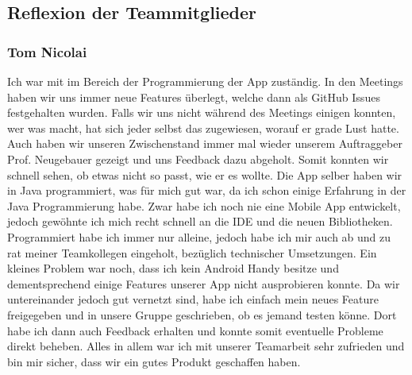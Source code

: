\documentclass{article}
\begin{document}
\subsection{Reflexion der Teammitglieder}
\subsubsection{Tom Nicolai}
    Ich war mit im Bereich der Programmierung der App zuständig. In den Meetings haben wir uns immer neue Features überlegt, 
    welche dann als GitHub Issues festgehalten wurden. Falls wir uns nicht während des Meetings einigen konnten, wer was macht, 
    hat sich jeder selbst das zugewiesen, worauf er grade Lust hatte. Auch haben wir unseren Zwischenstand immer mal wieder unserem 
Auftraggeber Prof. Neugebauer gezeigt und uns Feedback dazu abgeholt. Somit konnten wir schnell sehen, ob etwas nicht so passt, 
    wie er es wollte. Die App selber haben wir in Java programmiert, was für mich gut war, da ich schon einige Erfahrung 
    in der Java Programmierung habe. Zwar habe ich noch nie eine Mobile App entwickelt, jedoch gewöhnte ich mich recht schnell 
    an die IDE und die neuen Bibliotheken. Programmiert habe ich immer nur alleine, jedoch habe ich mir auch ab und zu rat meiner 
    Teamkollegen eingeholt, bezüglich technischer Umsetzungen. Ein kleines Problem war noch, dass ich kein Android Handy besitze 
    und dementsprechend einige Features unserer App nicht ausprobieren konnte. Da wir untereinander jedoch gut vernetzt sind, 
    habe ich einfach mein neues Feature freigegeben und in unsere Gruppe geschrieben, ob es jemand testen könne. 
    Dort habe ich dann auch Feedback erhalten und konnte somit eventuelle Probleme direkt beheben. Alles in allem 
    war ich mit unserer Teamarbeit sehr zufrieden und bin mir sicher, dass wir ein gutes Produkt geschaffen haben.
\end{document}
